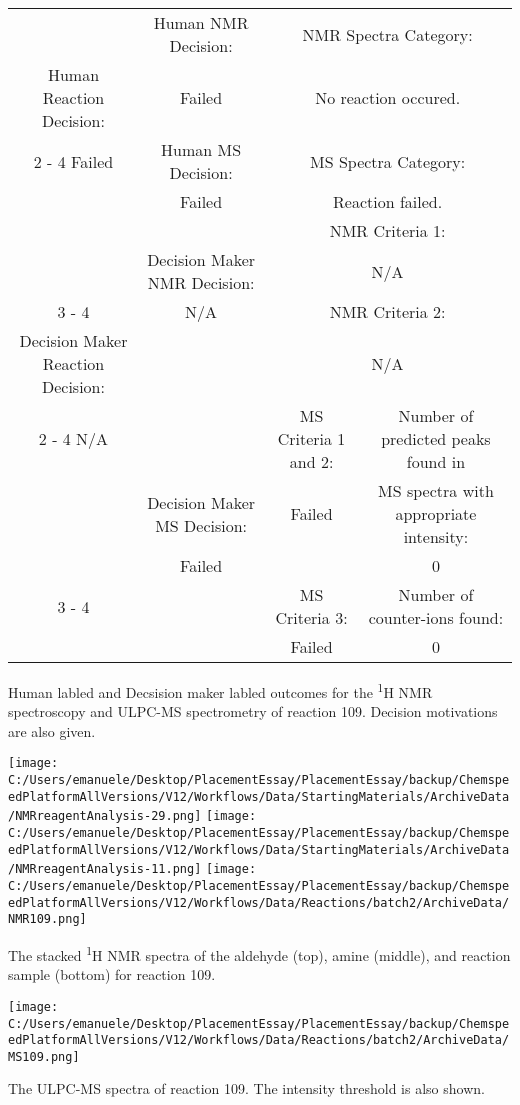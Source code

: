 \documentclass{article}%
\begin{document}
\begin{Decision Table}[H]%
\begin{tabular}{|c|c|c|c|}%
\hline%
&Human NMR Decision:&\multicolumn{2}{|c|}{NMR Spectra Category:}\\%
Human Reaction Decision:&Failed&\multicolumn{2}{|c|}{No reaction occured.}\\%
\cline{2%
-%
4}%
Failed&Human MS Decision:&\multicolumn{2}{|c|}{MS Spectra Category:}\\%
&Failed&\multicolumn{2}{|c|}{Reaction failed.}\\%
\hline%
&&\multicolumn{2}{|c|}{NMR Criteria 1:}\\%
&Decision Maker NMR Decision:&\multicolumn{2}{|c|}{N/A}\\%
\cline{3%
-%
4}%
&N/A&\multicolumn{2}{|c|}{NMR Criteria 2:}\\%
Decision Maker Reaction Decision:&&\multicolumn{2}{|c|}{N/A}\\%
\cline{2%
-%
4}%
N/A&&MS Criteria 1 and 2:&Number of predicted peaks found in\\%
&Decision Maker MS Decision:&Failed&MS spectra with appropriate intensity:\\%
&Failed&&0\\%
\cline{3%
-%
4}%
&&MS Criteria 3:&Number of counter{-}ions found:\\%
&&Failed&0\\%
\hline%
\end{tabular}%
\caption{Human labled and Decsision maker labled outcomes for the \textsuperscript{1}H NMR spectroscopy and ULPC-MS spectrometry of reaction 109. Decision motivations are also given.}%
\end{Decision Table}%
\begin{NMR Spectra}[H]%
\begin{center}%
\texttt{[image: C:/Users/emanuele/Desktop/PlacementEssay/PlacementEssay/backup/ChemspeedPlatformAllVersions/V12/Workflows/Data/StartingMaterials/ArchiveData/NMRreagentAnalysis-29.png]}\hfill%
\texttt{[image: C:/Users/emanuele/Desktop/PlacementEssay/PlacementEssay/backup/ChemspeedPlatformAllVersions/V12/Workflows/Data/StartingMaterials/ArchiveData/NMRreagentAnalysis-11.png]}\hfill%
\texttt{[image: C:/Users/emanuele/Desktop/PlacementEssay/PlacementEssay/backup/ChemspeedPlatformAllVersions/V12/Workflows/Data/Reactions/batch2/ArchiveData/NMR109.png]}\hfill%
\end{center}%
\caption{The stacked \textsuperscript{1}H NMR spectra of the aldehyde (top), amine (middle), and reaction sample (bottom) for reaction 109.}%
\end{NMR Spectra}%
\begin{MS Spectra}[H]%
\begin{center}%
\texttt{[image: C:/Users/emanuele/Desktop/PlacementEssay/PlacementEssay/backup/ChemspeedPlatformAllVersions/V12/Workflows/Data/Reactions/batch2/ArchiveData/MS109.png]}\hfill%
\end{center}%
\caption{The ULPC-MS spectra of reaction 109. The intensity threshold is also shown.}%
\end{MS Spectra}%
\end{document}
